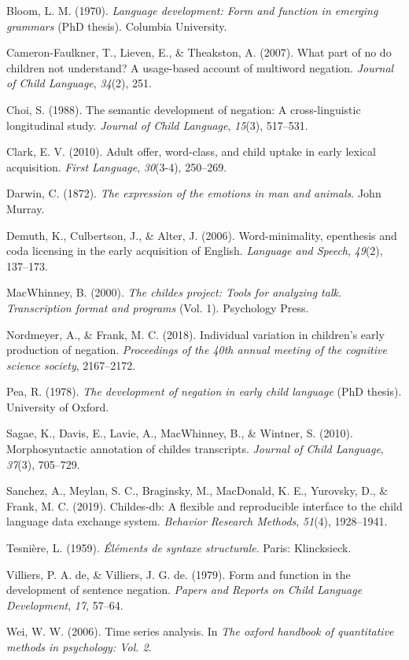 \documentclass[
  english,
  man,floatsintext]{apa6}
\begin{document}
\leavevmode\hypertarget{ref-bloom1970language}{}%
Bloom, L. M. (1970). \emph{Language development: Form and function in emerging grammars} (PhD thesis). Columbia University.

\leavevmode\hypertarget{ref-cameron2007part}{}%
Cameron-Faulkner, T., Lieven, E., \& Theakston, A. (2007). What part of no do children not understand? A usage-based account of multiword negation. \emph{Journal of Child Language}, \emph{34}(2), 251.

\leavevmode\hypertarget{ref-choi1988semantic}{}%
Choi, S. (1988). The semantic development of negation: A cross-linguistic longitudinal study. \emph{Journal of Child Language}, \emph{15}(3), 517--531.

\leavevmode\hypertarget{ref-clark2010adult}{}%
Clark, E. V. (2010). Adult offer, word-class, and child uptake in early lexical acquisition. \emph{First Language}, \emph{30}(3-4), 250--269.

\leavevmode\hypertarget{ref-darwin1872expression}{}%
Darwin, C. (1872). \emph{The expression of the emotions in man and animals}. John Murray.

\leavevmode\hypertarget{ref-demuth2006word}{}%
Demuth, K., Culbertson, J., \& Alter, J. (2006). Word-minimality, epenthesis and coda licensing in the early acquisition of English. \emph{Language and Speech}, \emph{49}(2), 137--173.

\leavevmode\hypertarget{ref-macwhinney2000childes}{}%
MacWhinney, B. (2000). \emph{The childes project: Tools for analyzing talk. Transcription format and programs} (Vol. 1). Psychology Press.

\leavevmode\hypertarget{ref-nordmeyer2018individual}{}%
Nordmeyer, A., \& Frank, M. C. (2018). Individual variation in children's early production of negation. \emph{Proceedings of the 40th annual meeting of the cognitive science society}, 2167--2172.

\leavevmode\hypertarget{ref-pea1978}{}%
Pea, R. (1978). \emph{The development of negation in early child language} (PhD thesis). University of Oxford.

\leavevmode\hypertarget{ref-sagae2010morphosyntactic}{}%
Sagae, K., Davis, E., Lavie, A., MacWhinney, B., \& Wintner, S. (2010). Morphosyntactic annotation of childes transcripts. \emph{Journal of Child Language}, \emph{37}(3), 705--729.

\leavevmode\hypertarget{ref-sanchez2019childes}{}%
Sanchez, A., Meylan, S. C., Braginsky, M., MacDonald, K. E., Yurovsky, D., \& Frank, M. C. (2019). Childes-db: A flexible and reproducible interface to the child language data exchange system. \emph{Behavior Research Methods}, \emph{51}(4), 1928--1941.

\leavevmode\hypertarget{ref-dg}{}%
Tesnière, L. (1959). \emph{Éléments de syntaxe structurale}. Paris: Klincksieck.

\leavevmode\hypertarget{ref-de1979form}{}%
Villiers, P. A. de, \& Villiers, J. G. de. (1979). Form and function in the development of sentence negation. \emph{Papers and Reports on Child Language Development}, \emph{17}, 57--64.

\leavevmode\hypertarget{ref-wei2006time}{}%
Wei, W. W. (2006). Time series analysis. In \emph{The oxford handbook of quantitative methods in psychology: Vol. 2}.
\end{document}
